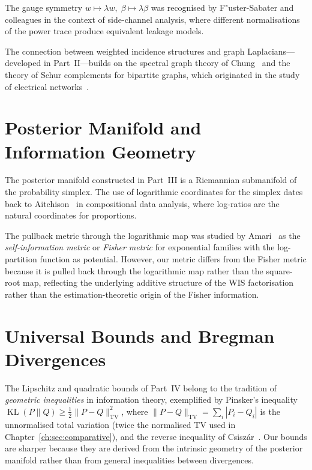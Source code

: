 The gauge symmetry $w\mapsto\lambda w,\;\beta\mapsto\lambda\beta$
was recognised by F"{u}ster-Sabater and colleagues in the context
of side-channel analysis, where different normalisations of the
power trace produce equivalent leakage models.

The connection between weighted incidence structures and graph
Laplacians---developed in Part~II---builds on the spectral graph
theory of Chung~\cite{chung1997spectral} and the theory of
Schur complements for bipartite graphs, which originated in
the study of electrical networks~\cite{vanvalkenburg1974network}.

\section{Posterior Manifold and Information Geometry}\label{ch:sec:historical-posterior}

The posterior manifold constructed in Part~III is a Riemannian
submanifold of the probability simplex.  The use of logarithmic
coordinates for the simplex dates back to Aitchison~\cite{aitchison1982statistical}
in compositional data analysis, where log-ratios are the natural
coordinates for proportions.

The pullback metric through the logarithmic map was studied
by Amari~\cite{amari2016information} as the \emph{self-information
metric} or \emph{Fisher metric} for exponential families with
the log-partition function as potential.  However, our metric
differs from the Fisher metric because it is pulled back through
the logarithmic map rather than the square-root map, reflecting
the underlying additive structure of the WIS factorisation rather
than the estimation-theoretic origin of the Fisher information.

\section{Universal Bounds and Bregman Divergences}\label{ch:sec:historical-bounds}

The Lipschitz and quadratic bounds of Part~IV belong to the
tradition of \emph{geometric inequalities} in information theory,
exemplified by Pinsker's inequality $\operatorname{KL}(P\|Q)\ge\frac12\|P-Q\|_{\mathrm{TV}}^2$, where $\|P-Q\|_{\mathrm{TV}}=\sum_i|P_i-Q_i|$ is the unnormalised total variation (twice the normalised TV used in Chapter~\ref{ch:sec:comparative}),
and the reverse inequality of Csisz\'ar~\cite{csiszar1996almost}.
Our bounds are sharper because they are derived from the intrinsic
geometry of the posterior manifold rather than from general
inequalities between divergences.

